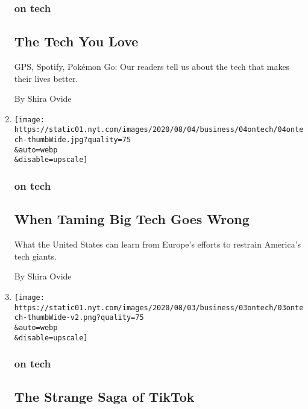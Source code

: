 \begin{enumerate}
  \hypertarget{on-tech-2}{%
  \subsubsection{on tech}\label{on-tech-2}}

  \hypertarget{the-tech-you-love}{%
  \subsection{The Tech You Love}\label{the-tech-you-love}}

  GPS, Spotify, Pokémon Go: Our readers tell us about the tech that
  makes their lives better.

  By Shira Ovide
\item
  \href{/2020/08/04/technology/europe-big-tech.html}{}

  \texttt{[image: https://static01.nyt.com/images/2020/08/04/business/04ontech/04ontech-thumbWide.jpg?quality=75\\\&auto=webp\\\&disable=upscale]}

  \hypertarget{on-tech-3}{%
  \subsubsection{on tech}\label{on-tech-3}}

  \hypertarget{when-taming-big-tech-goes-wrong}{%
  \subsection{When Taming Big Tech Goes
  Wrong}\label{when-taming-big-tech-goes-wrong}}

  What the United States can learn from Europe's efforts to restrain
  America's tech giants.

  By Shira Ovide
\item
  \href{/2020/08/03/technology/tiktok-microsoft.html}{}

  \texttt{[image: https://static01.nyt.com/images/2020/08/03/business/03ontech/03ontech-thumbWide-v2.png?quality=75\\\&auto=webp\\\&disable=upscale]}

  \hypertarget{on-tech-4}{%
  \subsubsection{on tech}\label{on-tech-4}}

  \hypertarget{the-strange-saga-of-tiktok}{%
  \subsection{The Strange Saga of
  TikTok}\label{the-strange-saga-of-tiktok}}


\end{enumerate}
